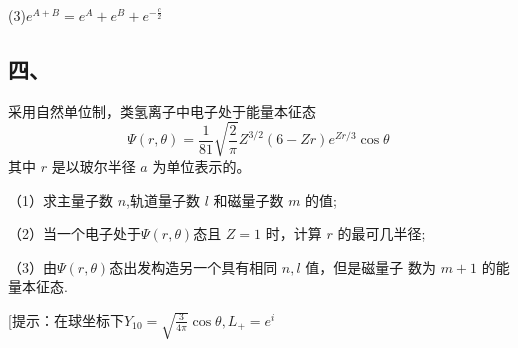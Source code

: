(3)$e^{A+B} =e^A+e^B+e^{-\frac{c}{2}}$ 
\subsection{四、}

采用自然单位制，类氢离子中电子处于能量本征态
$$\Psi(r,\theta)=\frac{1}{81}\sqrt{\frac{2}{\pi}}Z^{3/2}(6-Zr)e^{Zr/3}\cos\theta~$$
其中 $r$ 是以玻尔半径 $a$ 为单位表示的。

（1）求主量子数 $n$,轨道量子数 $l$ 和磁量子数 $m$ 的值;

（2）当一个电子处于$\Psi(r,\theta)$态且 $Z=1$ 时，计算 $r$ 的最可几半径;

（3）由$\Psi(r,\theta)$态出发构造另一个具有相同 $n,l$ 值，但是磁量子
数为 $m+1$ 的能量本征态.

[提示：在球坐标下$Y_10=\sqrt{\frac{3}{4 \pi}}\cos\theta,L_+=e^{i}$